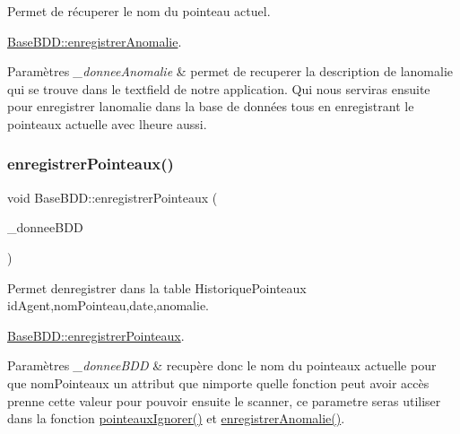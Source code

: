 Permet de récuperer le nom du pointeau actuel. 

\hyperlink{class_base_b_d_d_a9c5f51c11f49e494e608a9dafb635629}{Base\+B\+D\+D\+::enregistrer\+Anomalie}.


\begin{DoxyParams}{Paramètres}
{\em \+\_\+donnee\+Anomalie} & permet de recuperer la description de l\textquotesingle{}anomalie qui se trouve dans le textfield de notre application. Qui nous serviras ensuite pour enregistrer l\textquotesingle{}anomalie dans la base de données tous en enregistrant le pointeaux actuelle avec l\textquotesingle{}heure aussi. \\
\hline
\end{DoxyParams}
\mbox{\label{class_base_b_d_d_a52ff865a9fc36b11a9c2cbdb8cd9daa1}} 
\subsubsection{\texorpdfstring{enregistrer\+Pointeaux()}{enregistrerPointeaux()}}
{\footnotesize\ttfamily void Base\+B\+D\+D\+::enregistrer\+Pointeaux (\begin{DoxyParamCaption}\item[{const Q\+String}]{\+\_\+donnee\+B\+DD }\end{DoxyParamCaption})}



Permet d\textquotesingle{}enregistrer dans la table Historique\+Pointeaux id\+Agent,nom\+Pointeau,date,anomalie. 

\hyperlink{class_base_b_d_d_a52ff865a9fc36b11a9c2cbdb8cd9daa1}{Base\+B\+D\+D\+::enregistrer\+Pointeaux}.


\begin{DoxyParams}{Paramètres}
{\em \+\_\+donnee\+B\+DD} & recupère donc le nom du pointeaux actuelle pour que nom\+Pointeaux un attribut que n\textquotesingle{}importe qu\textquotesingle{}elle fonction peut avoir accès prenne cette valeur pour pouvoir ensuite le scanner, ce parametre seras utiliser dans la fonction \hyperlink{class_base_b_d_d_acbdf1ddaaaff9fa469ecef3a14ef1081}{pointeaux\+Ignorer()} et \hyperlink{class_base_b_d_d_a9c5f51c11f49e494e608a9dafb635629}{enregistrer\+Anomalie()}. \\
\hline
\end{DoxyParams}
\mbox{\label{class_base_b_d_d_af25fa79519e164584eea311acafd51e7}} 

